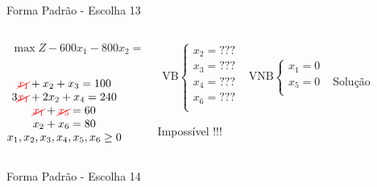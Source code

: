 \begin{frame}
{\begin{block}{Forma Padrão - {\color{cyan}Escolha 13}}
			\begin{columns}
				\begin{column}{0.35\textwidth}
					$
						\begin{matrix}
							\max Z - 600x_1 - 800x_2 = 0 \\
						\end{matrix}
					$ \\
					 \\
					$
						\begin{matrix}
							{\color{red}\cancel{x_1}}  + x_2  + x_3                   = 100 \\
							3{\color{red}\cancel{x_1}} + 2x_2       + x_4             = 240 \\
							{\color{red}\cancel{x_1}}                     + {\color{red}\cancel{x_5}}       = 60 \\
							x_2                           + x_6 = 80 \\
							x_1,x_2, x_3, x_4, x_5, x_6 \ge 0 \\
						\end{matrix}
					$
				\end{column}
				\vline
				\hspace{0.1cm}
				\begin{column}{0.45\textwidth}
						$
							\begin{matrix}
								\text{VB} \left\{  \begin{matrix}
																 x_2 = \text{???} \\
																 x_3 = \text{???} \\
																 x_4 = \text{???} \\
																 x_6 = \text{???} \\
												   \end{matrix} 
										   \right.
								&
								\text{VNB} \left\{  \begin{matrix}
																 x_1 = 0 \\
																 x_5 = 0 \\
												   \end{matrix} 
										   \right. 
								\\
							 & \\
							\end{matrix}
						$
						{\color{red}Solução Impossível !!!}
				\end{column}
			\end{columns}
		\end{block}
	}
	{
		\begin{block}{Forma Padrão - {\color{cyan}Escolha 14}}

\end{block}}
\end{frame}
